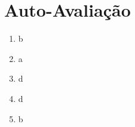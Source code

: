 \documentclass[12pt]{article}
\begin{document}



\newpage 
\section*{Auto-Avaliação}

\begin{enumerate}
    \item b
    \item a
    \item d
    \item d
    \item b
\end{enumerate}
\end{document}
